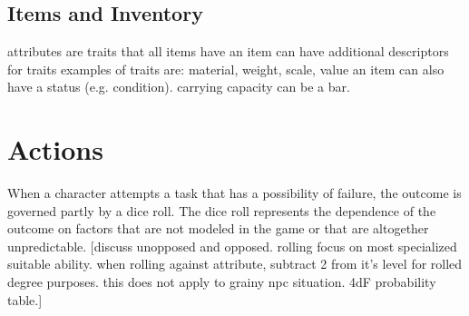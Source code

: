 \documentclass[12pt]{article}
\newcommand{\notes}[1]{{\color{Tan} #1}}
\begin{document}



\subsection{Items and Inventory} \label{sec:items}
\notes{attributes are traits that all items have
an item can have additional descriptors for traits
examples of traits are: material, weight, scale, value
an item can also have a status (e.g. condition).
carrying capacity can be a bar.}


\section{Actions}\label{sec:actions}
When a character attempts a task that has a possibility of failure, the outcome is governed partly by a dice roll.
The dice roll represents the dependence of the outcome on factors that are not modeled in the game or that are altogether unpredictable.
\notes{[discuss unopposed and opposed. rolling focus on most specialized suitable ability. when rolling against attribute, subtract 2 from it's level for rolled degree purposes. this does not apply to grainy npc situation. 4dF probability table.]}
\end{document}
